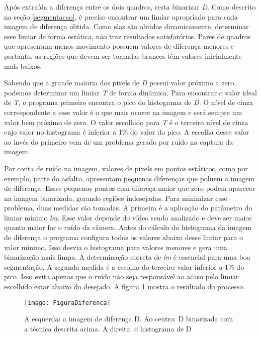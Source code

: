     Após extraída a diferença entre os dois quadros, resta binarizar \textit{D}. Como descrito na seção \ref{segmentacao}, é preciso encontrar um limiar apropriado para cada imagem de diferença obtida. Como elas são obtidas dinamicamente, determinar esse limiar de forma estática, não traz resultados satisfatórios. Pares de quadros que apresentam menos movimento possuem valores de diferença menores e portanto, as regiões que devem ser tornadas brances têm valores inicialmente mais baixos.

    Sabendo que a grande maioria dos pixels de \textit{D} possui valor próximo a zero, podemos determinar um limiar \textit{T} de forma dinâmica. Para encontrar o valor ideal de \textit{T}, o programa primeiro encontra o pico do histograma de \textit{D}. O nível de cinza correspondente a esse valor é o que mais ocorre na imagem e será sempre um valor bem próximo de zero. O valor escolhido para \textit{T} é o terceiro nível de cinza cujo valor no histograma é inferior a 1\% do valor do pico. A escolha desse valor ao invés do primeiro vem de um problema gerado por ruído na captura da imagem.

    Por conta de ruído na imagem, valores de pixels em pontos estáticos, como por exemplo, parte do asfalto, apresentam pequenas diferenças que poluem a imagem de diferença. Esses pequenos pontos com difereça maior que zero podem aparecer na imagem binarizada, gerando regiões indesejadas. Para minimizar esse problema, duas medidas são tomadas. A primeira é a aplicação do parâmetro do limiar mínimo \textit{lm}. Esse valor depende do vídeo sendo analizado e deve ser maior quanto maior for o ruído da câmera. Antes do cálculo do histograma da imagem de diferença o programa configura todos os valores abaixo desse limiar para o valor mínimo. Isso desvia o histograma para valores menores e gera uma binarização mais limpa. A determinação correta de \textit{lm} é essencial para uma boa segmentação. A segunda medida é a escolha do terceiro valor inferior a 1\% do pico. Isso evita apenas que o ruído não seja responsável ao acaso pelo limiar escolhido estar abaixo do desejado. A figura \ref{fig:Diferenca} mostra o resultado do processo.

    \begin{figure}[h]
      \centering
      \texttt{[image: FiguraDiferenca]}
      \caption{A esquerda: a imagem de diferença D. Ao centro: D binarizada com a técnica descrita acima. A direita: o histograma de D}\label{fig:Diferenca}
    \end{figure}

